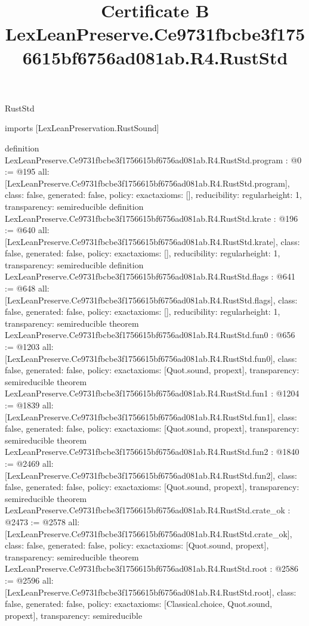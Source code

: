 \begin{lexlean}{RustStd}
\title{Certificate B LexLeanPreserve.Ce9731fbcbe3f1756615bf6756ad081ab.R4.RustStd}
\begin{coremodule}
imports [LexLeanPreservation.RustSound]

definition LexLeanPreserve.Ce9731fbcbe3f1756615bf6756ad081ab.R4.RustStd.program : @0 := @195 {
  all: [LexLeanPreserve.Ce9731fbcbe3f1756615bf6756ad081ab.R4.RustStd.program],
  class: false,
  generated: false,
  policy: exact{axioms: []},
  reducibility: regular{height: 1},
  transparency: semireducible
}
definition LexLeanPreserve.Ce9731fbcbe3f1756615bf6756ad081ab.R4.RustStd.krate : @196 := @640 {
  all: [LexLeanPreserve.Ce9731fbcbe3f1756615bf6756ad081ab.R4.RustStd.krate],
  class: false,
  generated: false,
  policy: exact{axioms: []},
  reducibility: regular{height: 1},
  transparency: semireducible
}
definition LexLeanPreserve.Ce9731fbcbe3f1756615bf6756ad081ab.R4.RustStd.flags : @641 := @648 {
  all: [LexLeanPreserve.Ce9731fbcbe3f1756615bf6756ad081ab.R4.RustStd.flags],
  class: false,
  generated: false,
  policy: exact{axioms: []},
  reducibility: regular{height: 1},
  transparency: semireducible
}
theorem LexLeanPreserve.Ce9731fbcbe3f1756615bf6756ad081ab.R4.RustStd.fun0 : @656 := @1203 {
  all: [LexLeanPreserve.Ce9731fbcbe3f1756615bf6756ad081ab.R4.RustStd.fun0],
  class: false,
  generated: false,
  policy: exact{axioms: [Quot.sound, propext]},
  transparency: semireducible
}
theorem LexLeanPreserve.Ce9731fbcbe3f1756615bf6756ad081ab.R4.RustStd.fun1 : @1204 := @1839 {
  all: [LexLeanPreserve.Ce9731fbcbe3f1756615bf6756ad081ab.R4.RustStd.fun1],
  class: false,
  generated: false,
  policy: exact{axioms: [Quot.sound, propext]},
  transparency: semireducible
}
theorem LexLeanPreserve.Ce9731fbcbe3f1756615bf6756ad081ab.R4.RustStd.fun2 : @1840 := @2469 {
  all: [LexLeanPreserve.Ce9731fbcbe3f1756615bf6756ad081ab.R4.RustStd.fun2],
  class: false,
  generated: false,
  policy: exact{axioms: [Quot.sound, propext]},
  transparency: semireducible
}
theorem LexLeanPreserve.Ce9731fbcbe3f1756615bf6756ad081ab.R4.RustStd.crate_ok : @2473 := @2578 {
  all: [LexLeanPreserve.Ce9731fbcbe3f1756615bf6756ad081ab.R4.RustStd.crate_ok],
  class: false,
  generated: false,
  policy: exact{axioms: [Quot.sound, propext]},
  transparency: semireducible
}
theorem LexLeanPreserve.Ce9731fbcbe3f1756615bf6756ad081ab.R4.RustStd.root : @2586 := @2596 {
  all: [LexLeanPreserve.Ce9731fbcbe3f1756615bf6756ad081ab.R4.RustStd.root],
  class: false,
  generated: false,
  policy: exact{axioms: [Classical.choice, Quot.sound, propext]},
  transparency: semireducible
}


\end{coremodule}
\end{lexlean}
